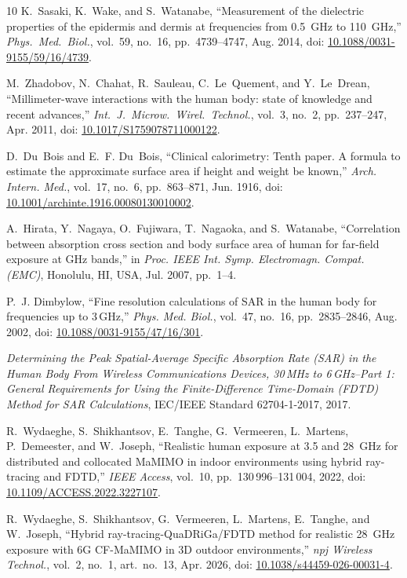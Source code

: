 \documentclass[journal,twocolumn,10pt]{IEEEtran}
\newcommand*{\doi}[1]{\href{https://doi.org/#1}{#1}}
\theoremstyle{plain}
\begin{document}
\begin{thebibliography}{10}
K.~Sasaki, K.~Wake, and S.~Watanabe, ``Measurement of the dielectric
  properties of the epidermis and dermis at frequencies from 0.5~GHz
  to 110~GHz,'' \emph{Phys.\ Med.\ Biol.}, vol.~59, no.~16,
  pp.~4739--4747, Aug. 2014,
  doi: \doi{10.1088/0031-9155/59/16/4739}.

M.~Zhadobov, N.~Chahat, R.~Sauleau, C.~Le~Quement, and Y.~Le~Drean,
  ``Millimeter-wave interactions with the human body: state of
  knowledge and recent advances,'' \emph{Int.\ J.\ Microw.\ Wirel.\
  Technol.}, vol.~3, no.~2, pp.~237--247, Apr. 2011,
  doi: \doi{10.1017/S1759078711000122}.

D.~Du~Bois and E.~F. Du~Bois, ``Clinical calorimetry: Tenth paper.
  A formula to estimate the approximate surface area if height and
  weight be known,'' \emph{Arch. Intern. Med.}, vol.~17, no.~6,
  pp.~863--871, Jun. 1916,
  doi: \doi{10.1001/archinte.1916.00080130010002}.

A.~Hirata, Y.~Nagaya, O.~Fujiwara, T.~Nagaoka, and S.~Watanabe,
  ``Correlation between absorption cross section and body surface area
  of human for far-field exposure at GHz bands,'' in \emph{Proc. IEEE
  Int. Symp. Electromagn. Compat. (EMC)}, Honolulu, HI, USA, Jul. 2007,
  pp.~1--4.

P.~J. Dimbylow, ``Fine resolution calculations of SAR in the human body
  for frequencies up to 3\,GHz,'' \emph{Phys. Med. Biol.}, vol.~47,
  no.~16, pp.~2835--2846, Aug. 2002,
  doi: \doi{10.1088/0031-9155/47/16/301}.

\emph{Determining the Peak Spatial-Average Specific Absorption Rate
  (SAR) in the Human Body From Wireless Communications Devices, 30\,MHz
  to 6\,GHz--Part 1: General Requirements for Using the
  Finite-Difference Time-Domain (FDTD) Method for SAR Calculations},
  IEC/IEEE Standard 62704-1-2017, 2017.

R.~Wydaeghe, S.~Shikhantsov, E.~Tanghe, G.~Vermeeren, L.~Martens,
  P.~Demeester, and W.~Joseph, ``Realistic human exposure at
  3.5 and 28~GHz for distributed and collocated MaMIMO in indoor
  environments using hybrid ray-tracing and FDTD,'' \emph{IEEE
  Access}, vol.~10, pp.~130\,996--131\,004, 2022, doi:
  \doi{10.1109/ACCESS.2022.3227107}.

R.~Wydaeghe, S.~Shikhantsov, G.~Vermeeren, L.~Martens, E.~Tanghe,
  and W.~Joseph, ``Hybrid ray-tracing-QuaDRiGa/FDTD method for
  realistic 28~GHz exposure with 6G CF-MaMIMO in 3D outdoor
  environments,'' \emph{npj Wireless Technol.}, vol.~2, no.~1,
  art.~no.~13, Apr. 2026, doi: \doi{10.1038/s44459-026-00031-4}.


\end{thebibliography}
\end{document}
